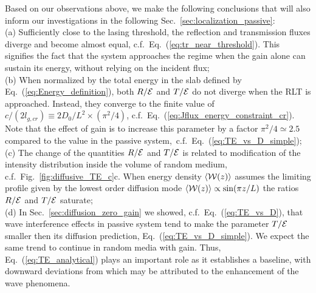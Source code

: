 
Based on our observations above, we make the following conclusions that will also inform our investigations in the following Sec.~\ref{sec:localization_passive}:\\
(a) Sufficiently close to the lasing threshold, the reflection and transmission fluxes diverge and become almost equal, c.f.~Eq.~(\ref{eq:tr_near_threshold}). This signifies the fact that the system approaches the regime when the gain alone can sustain its energy, without relying on the incident flux;\\
(b) When normalized by the total energy in the slab defined by Eq.~(\ref{eq:Energy_definition}), both $R/{\cal E}$  and $T/{\cal E}$ do not diverge when the RLT is approached. Instead, they converge to the finite value of $c/(2l_{g,cr})\equiv 2D_0/L^2\times (\pi^2/4)$, c.f.~Eq.~(\ref{eq:Jflux_energy_constraint_cr}). Note that the effect of gain is to increase this parameter by a factor $\pi^2/4\simeq 2.5$ compared to the value in the passive system,~c.f.~Eq.~(\ref{eq:TE_vs_D_simple});\\
(c) The change of the quantities $R/{\cal E}$ and $T /{\cal E}$ is related to modification of the intensity distribution inside the volume of random medium, c.f.~Fig.~\ref{fig:diffusive_TE_c}c. When energy density $\langle {\cal W}(z)\rangle$ assumes the limiting profile given by the lowest order diffusion mode $\langle {\cal W}(z)\rangle\propto\sin(\pi z/L)$ the ratios $R/{\cal E}$  and $T/{\cal E}$ saturate;\\
(d) In Sec.~\ref{sec:diffusion_zero_gain} we showed, c.f.~Eq.~(\ref{eq:TE_vs_D}), that wave interference effects in passive system tend to make the parameter $T/{\cal E}$ smaller then its diffusion prediction, Eq.~(\ref{eq:TE_vs_D_simple}). We expect the same trend to continue in random media with gain. Thus, Eq.~(\ref{eq:TE_analytical}) plays an important role as it establishes a baseline, with downward deviations from which  may be attributed to the enhancement of the wave phenomena.

